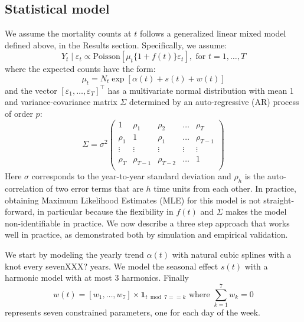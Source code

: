 \documentclass[11pt]{article}
\begin{document}
\subsection{Statistical model}
\label{subsec:statistical-model}
We assume the mortality counts at $t$ follows a generalized linear mixed model defined above, in the Results section. Specifically, we assume:
\begin{equation*}
    Y_t \mid \varepsilon_t \propto \mbox{Poisson}[ \mu_t \{1 + f(t)\}  \varepsilon_t ], \mbox{ for } t = 1, \dots,T 
\end{equation*}
where the expected counts have the form:
\begin{equation*}
    \mu_t =N_t  \exp[\alpha(t) + s(t) + w(t)]
\end{equation*}
and the vector $[\varepsilon_1, \ldots, \varepsilon_T]^\top$ has a multivariate normal distribution with mean 1 and variance-covariance matrix $\Sigma$ determined by an auto-regressive (AR) process of order $p$:
\begin{equation*}
    \Sigma = \sigma^2
    \begin{pmatrix} 1 & \rho_1 & \rho_{2} & \dots & \rho_{T} \\ 
    \rho_{1} & 1 & \rho_{1} & \ldots & \rho_{T-1} \\
    \vdots & \vdots & \vdots & \vdots & \vdots \\
    \rho_{T} & \rho_{T-1} & \rho_{T-2} & \dots & 1 \\ 
    \end{pmatrix}
\end{equation*}
Here $\sigma$ corresponds to the year-to-year standard deviation and $\rho_h$ is the auto-correlation of two error terms that are $h$ time units from each other. In practice, obtaining Maximum Likelihood Estimates (MLE) for this model is not straight-forward, in particular because the flexibility in $f(t)$ and $\Sigma$ makes the model non-identifiable in practice. We now describe a three step approach that works well in practice, as demonstrated both by simulation and empirical validation.

We start by modeling the yearly trend $\alpha(t)$ with natural cubic splines with a knot every sevenXXX? years. We model the seasonal effect $s(t)$ with a harmonic model with at most 3 harmonics. Finally
\begin{equation*}
    w(t) = [w_1, \ldots, w_7] \times \boldsymbol{1}_{t \bmod 7==k} \mbox{ where } \sum_{k=1}^7 w_k = 0
\end{equation*}
represents seven constrained parameters, one for each day of the week. 
\end{document}
